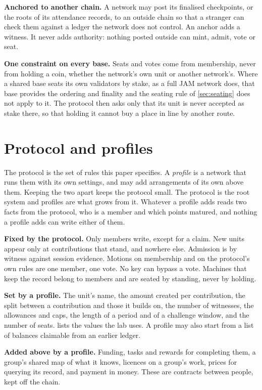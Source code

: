 \documentclass[11pt,a4paper]{article}
\theoremstyle{definition}
\theoremstyle{plain}
\theoremstyle{remark}
\begin{document}
\textbf{Anchored to another chain.} A network may post its finalised checkpoints, or the roots of its attendance records, to an outside chain so that a stranger can check them against a ledger the network does not control. An anchor adds a witness. It never adds authority: nothing posted outside can mint, admit, vote or seat.

\textbf{One constraint on every base.} Seats and votes come from membership, never from holding a coin, whether the network's own unit or another network's. Where a shared base seats its own validators by stake, as a full JAM network does, that base provides the ordering and finality and the seating rule of \cref{sec:seating} does not apply to it. The protocol then asks only that its unit is never accepted as stake there, so that holding it cannot buy a place in line by another route.

\section{Protocol and profiles}
\label{sec:profiles}

The protocol is the set of rules this paper specifies. A \emph{profile} is a network that runs them with its own settings, and may add arrangements of its own above them. Keeping the two apart keeps the protocol small. The protocol is the root system and profiles are what grows from it. Whatever a profile adds reads two facts from the protocol, who is a member and which points matured, and nothing a profile adds can write either of them.

\textbf{Fixed by the protocol.} Only members write, except for a claim. New units appear only at contributions that stand, and nowhere else. Admission is by witness against session evidence. Motions on membership and on the protocol's own rules are one member, one vote. No key can bypass a vote. Machines that keep the record belong to members and are seated by standing, never by holding.

\textbf{Set by a profile.} The unit's name, the amount created per contribution, the split between a contribution and those it builds on, the number of witnesses, the allowances and caps, the length of a period and of a challenge window, and the number of seats.  lists the values the lab uses. A profile may also start from a list of balances claimable from an earlier ledger.

\textbf{Added above by a profile.} Funding, tasks and rewards for completing them, a group's shared map of what it knows, licences on a group's work, prices for querying its record, and payment in money. These are contracts between people, kept off the chain.
\end{document}
